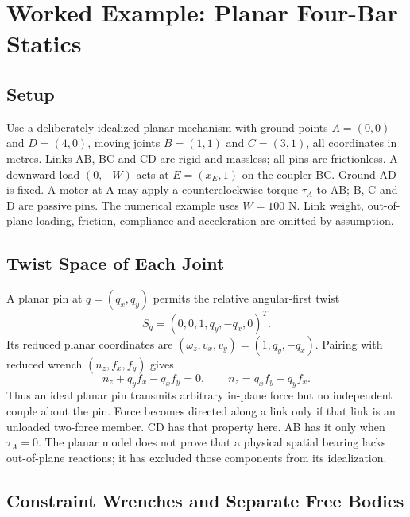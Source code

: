 \section{Worked Example: Planar Four-Bar Statics}
\label{sec:planar_mechanism_example}

\subsection{Setup}

Use a deliberately idealized planar mechanism with ground points $A=(0,0)$ and $D=(4,0)$, moving joints $B=(1,1)$ and $C=(3,1)$, all coordinates in metres. Links AB, BC and CD are rigid and massless; all pins are frictionless. A downward load $(0,-W)$ acts at $E=(x_E,1)$ on the coupler BC. Ground AD is fixed. A motor at A may apply a counterclockwise torque $\tau_A$ to AB; B, C and D are passive pins. The numerical example uses $W=100$ N. Link weight, out-of-plane loading, friction, compliance and acceleration are omitted by assumption.

\subsection{Twist Space of Each Joint}

A planar pin at $q=(q_x,q_y)$ permits the relative angular-first twist
\begin{equation}
 S_q=(0,0,1,q_y,-q_x,0)^T.
\end{equation}
Its reduced planar coordinates are $(\omega_z,v_x,v_y)=(1,q_y,-q_x)$. Pairing with reduced wrench $(n_z,f_x,f_y)$ gives
\begin{equation}
 n_z+q_yf_x-q_xf_y=0,\qquad n_z=q_xf_y-q_yf_x.
\end{equation}
Thus an ideal planar pin transmits arbitrary in-plane force but no independent couple about the pin. Force becomes directed along a link only if that link is an unloaded two-force member. CD has that property here. AB has it only when $\tau_A=0$. The planar model does not prove that a physical spatial bearing lacks out-of-plane reactions; it has excluded those components from its idealization.

\subsection{Constraint Wrenches and Separate Free Bodies}

